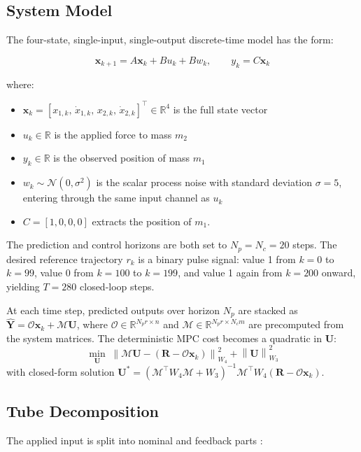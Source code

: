 \documentclass[11pt]{article}
\begin{document}
\subsection{System Model}
The four-state, single-input, single-output discrete-time model has the form:

$$\mathbf{x}_{k+1} = A\mathbf{x}_k + Bu_k + Bw_k, \qquad y_k = C\mathbf{x}_k$$

where:

\begin{itemize}
    \item $\mathbf{x}_k = [x_{1,k},\, \dot{x}_{1,k},\, x_{2,k},\, \dot{x}_{2,k}]^\top \in \mathbb{R}^4$ is the full state vector
    \item $u_k \in \mathbb{R}$ is the applied force to mass $m_2$
    \item $y_k \in \mathbb{R}$ is the observed position of mass $m_1$
    \item $w_k \sim \mathcal{N}(0, \sigma^2)$ is the scalar process noise with standard deviation $\sigma = 5$, entering through the same input channel as $u_k$
    \item $C = [1, 0, 0, 0]$ extracts the position of $m_1$.
\end{itemize}

The prediction and control horizons are both set to $N_p = N_c = 20$ steps. The desired reference trajectory $r_k$ is a binary pulse signal: value 1 from $k=0$ to $k=99$, value 0 from $k=100$ to $k=199$, and value 1 again from $k=200$ onward, yielding $T=280$ closed-loop steps.

At each time step, predicted outputs over horizon $N_p$ are stacked as $\hat{\mathbf{Y}} = \mathcal{O} \mathbf{x}_k + \mathcal{M} \mathbf{U}$, where $\mathcal{O} \in \mathbb{R}^{N_pr \times n}$ and $\mathcal{M} \in \mathbb{R}^{N_pr \times N_cm}$ are precomputed from the system matrices. The deterministic MPC cost becomes a quadratic in $\mathbf{U}$:
$$\min_{\mathbf{U}} \; \left\|\mathcal{M}\mathbf{U} - (\mathbf{R} - \mathcal{O}\mathbf{x}_k)\right\|^2_{W_4} + \left\|\mathbf{U}\right\|^2_{W_3}$$
with closed-form solution $\mathbf{U}^* = (\mathcal{M}^\top W_4 \mathcal{M} + W_3)^{-1} \mathcal{M}^\top W_4 (\mathbf{R} - \mathcal{O}\mathbf{x}_k)$.

\subsection{Tube Decomposition}
The applied input is split into nominal and feedback parts \cite{LANGSON2004125}:
\end{document}
